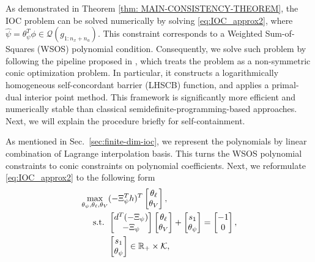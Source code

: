
As demonstrated in Theorem \ref{thm: MAIN-CONSISTENCY-THEOREM}, the IOC problem can be solved numerically by solving \eqref{eq:IOC_approx2}, where $\hat{\psi} = \theta_\psi^T\phi\in \mathscr{Q}(g_{1:n_x+n_a})$. 
This constraint corresponds to a Weighted Sum-of-Squares (WSOS) polynomial condition.
Consequently, we solve such problem by following the pipeline proposed in \citep{Papp2019sum}, which treats the problem as a non-symmetric conic optimization problem. In particular, it constructs a logarithmically homogeneous self-concordant barrier (LHSCB) function, and applies a primal-dual interior point method. 
This framework is significantly more efficient and numerically stable than classical semidefinite-programming-based approaches.
Next, we will explain the procedure briefly for self-containment.

As mentioned in Sec.~\ref{sec:finite-dim-ioc}, we represent the polynomials by linear combination of Lagrange interpolation basis. This turns the WSOS polynomial constraints to conic constraints on polynomial coefficients.  
Next, we reformulate \eqref{eq:IOC_approx2} to the following form
\begin{equation}\label{eq:dual-standform}
    \begin{aligned}
    \max_{\theta_\psi, \theta_\ell, \theta_V} &(-\Xi_\psi^Th)^T\begin{bmatrix}\theta_\ell\\\theta_V\end{bmatrix},\\
    \text{s.t. }& \begin{bmatrix}d^T(-\Xi_\psi)\\ -\Xi_\psi  \end{bmatrix}\begin{bmatrix}\theta_\ell\\\theta_V\end{bmatrix}
    + \begin{bmatrix} s_1\\\theta_\psi\end{bmatrix}
    = \begin{bmatrix}-1\\0\end{bmatrix},\\
    & \begin{bmatrix}s_1\\\theta_\psi\end{bmatrix} \in\mathbb{R}_+\times\mathcal{K},
\end{aligned}
\end{equation}
